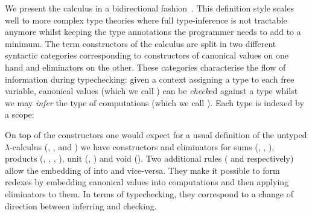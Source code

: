 
We present the calculus in a bidirectional fashion~\cite{pierce2000local}.
This definition style scales well to more complex type theories where full
type-inference is not tractable anymore whilst keeping the type annotations
the programmer needs to add to a minimum. The term constructors of the calculus
are split in two different syntactic categories corresponding to constructors
of canonical values on one hand and eliminators on the other. These categories
characterise the flow of information during typechecking: given a context
assigning a type to each free variable, canonical values (which we call \Checkable{})
can be \emph{check}ed against a type whilst we may \emph{infer} the type of
computations (which we call \Inferable{}). Each type is indexed by a scope:


On top of the constructors one would expect for a usual definition of
the untyped \ensuremath{\lambda}-calculus (\var{\cdot}, \app{\cdot}{\cdot}, and \lam{\cdot})
we have constructors and eliminators for sums (\inl{\cdot}, \inr{\cdot},
\cas{\cdot}{\cdot}{\cdot}{\cdot}), products (\prd{\cdot}, ,
\prl{\cdot}, \prr{\cdot}), unit (\uni{}, )
and void (\exf{\cdot}{\cdot}). Two additional rules (\neu{\cdot} and
\cut{\cdot}{\cdot} respectively) allow the embedding of \Inferable{}
into \Checkable{} and vice-versa. They make it possible to form redexes
by embedding canonical values into computations and then applying
eliminators to them. In terms of typechecking, they correspond to a
change of direction between inferring and checking.

